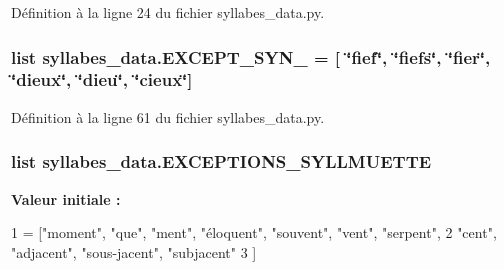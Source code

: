 Définition à la ligne 24 du fichier syllabes\+\_\+data.\+py.

\hypertarget{namespacesyllabes__data_a47ac52c89b4b44de5b1c98b1a12023de}{}
\subsubsection[{E\+X\+C\+E\+P\+T\+\_\+\+S\+Y\+N\+\_\+2}]{\setlength{\rightskip}{0pt plus 5cm}list syllabes\+\_\+data.\+E\+X\+C\+E\+P\+T\+\_\+\+S\+Y\+N\+\_ = \mbox{[} \char`\"{}fief\char`\"{}, \char`\"{}fiefs\char`\"{}, \char`\"{}fier\char`\"{}, \char`\"{}dieux\char`\"{}, \char`\"{}dieu\char`\"{}, \char`\"{}cieux\char`\"{}\mbox{]}}\label{namespacesyllabes__data_a47ac52c89b4b44de5b1c98b1a12023de}


Définition à la ligne 61 du fichier syllabes\+\_\+data.\+py.

\hypertarget{namespacesyllabes__data_ab907e12653d4c7ac44fb98d77c590c0d}{}
\subsubsection[{E\+X\+C\+E\+P\+T\+I\+O\+N\+S\+\_\+\+S\+Y\+L\+L\+M\+U\+E\+T\+T\+E}]{\setlength{\rightskip}{0pt plus 5cm}list syllabes\+\_\+data.\+E\+X\+C\+E\+P\+T\+I\+O\+N\+S\+\_\+\+S\+Y\+L\+L\+M\+U\+E\+T\+T\+E}\label{namespacesyllabes__data_ab907e12653d4c7ac44fb98d77c590c0d}
{\bfseries Valeur initiale \+:}
\begin{DoxyCode}
1 = [\textcolor{stringliteral}{"moment"}, \textcolor{stringliteral}{"que"}, \textcolor{stringliteral}{"ment"}, \textcolor{stringliteral}{"éloquent"}, \textcolor{stringliteral}{"souvent"}, \textcolor{stringliteral}{"vent"}, \textcolor{stringliteral}{"serpent"},
2 \textcolor{stringliteral}{"cent"}, \textcolor{stringliteral}{"adjacent"}, \textcolor{stringliteral}{"sous-jacent"}, \textcolor{stringliteral}{"subjacent"}
3 ]
\end{DoxyCode}


